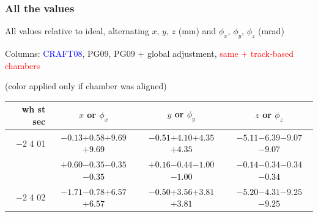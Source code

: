 \documentclass[compress]{beamer}
\begin{document}
\begin{frame}
\frametitle{All the values}
\tiny

All values relative to ideal, alternating $x$, $y$, $z$ (mm) and $\phi_x$, $\phi_y$, $\phi_z$ (mrad)

Columns: \textcolor{blue}{CRAFT08}, PG09, PG09 $+$ global adjustment, \textcolor{red}{same $+$ track-based chambers}

\hfill (color applied only if chamber was aligned)

\vfill
\renewcommand{\arraystretch}{1.1}
\begin{tabular}{r | c | c | c}
wh st sec & $x$ or $\phi_x$ & $y$ or $\phi_y$ & $z$ or $\phi_z$ \\\hline
$-$2 4 01 & \textcolor{black}{$-0.13$}\hspace{0.1 cm}$+0.58$\hspace{0.1 cm}$+9.69$\hspace{0.1 cm}\textcolor{black}{$+9.69$} & \textcolor{black}{$-0.51$}\hspace{0.1 cm}$+4.10$\hspace{0.1 cm}$+4.35$\hspace{0.1 cm}\textcolor{black}{$+4.35$} & \textcolor{black}{$-5.11$}\hspace{0.1 cm}$-6.39$\hspace{0.1 cm}$-9.07$\hspace{0.1 cm}\textcolor{black}{$-9.07$} \\
          & \textcolor{black}{$+0.60$}\hspace{0.1 cm}$-0.35$\hspace{0.1 cm}$-0.35$\hspace{0.1 cm}\textcolor{black}{$-0.35$} & \textcolor{black}{$+0.16$}\hspace{0.1 cm}$-0.44$\hspace{0.1 cm}$-1.00$\hspace{0.1 cm}\textcolor{black}{$-1.00$} & \textcolor{black}{$-0.14$}\hspace{0.1 cm}$-0.34$\hspace{0.1 cm}$-0.34$\hspace{0.1 cm}\textcolor{black}{$-0.34$} \\
$-$2 4 02 & \textcolor{black}{$-1.71$}\hspace{0.1 cm}$-0.78$\hspace{0.1 cm}$+6.57$\hspace{0.1 cm}\textcolor{black}{$+6.57$} & \textcolor{black}{$-0.50$}\hspace{0.1 cm}$+3.56$\hspace{0.1 cm}$+3.81$\hspace{0.1 cm}\textcolor{black}{$+3.81$} & \textcolor{black}{$-5.20$}\hspace{0.1 cm}$-4.31$\hspace{0.1 cm}$-9.25$\hspace{0.1 cm}\textcolor{black}{$-9.25$} \\

\end{tabular}
\end{frame}
\end{document}
